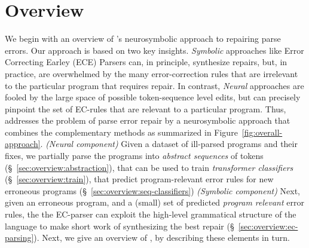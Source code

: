 \section{Overview}
\label{sec:overview}

We begin with an overview of \toolname's neurosymbolic
approach to repairing parse errors.
%
Our approach is based on two key insights.
%
\emph{Symbolic} approaches like Error Correcting
Earley (ECE) Parsers \citep{Aho_1972} can, in principle,
synthesize repairs, but, in practice, are overwhelmed by
the many error-correction rules that are irrelevant to the
particular program that requires repair.
%
In contrast, \emph{Neural} approaches
are fooled by the large space of possible
token-sequence level edits, but can precisely
pinpoint the set of EC-rules that are relevant
to a particular program.
%
Thus, \toolname addresses the problem of parse
error repair by a neurosymbolic approach that
combines the complementary methods as summarized
in Figure~\ref{fig:overall-approach}.
%
%
\emph{(Neural component)}
%
Given a dataset of ill-parsed programs and
their fixes, we partially parse the programs
into \emph{abstract sequences} of tokens
(\S~\ref{sec:overview:abstraction}), that can
be used to train \emph{transformer classifiers}
(\S~\ref{sec:overview:train}), that predict
program-relevant error rules for new erroneous
programs (\S~\ref{sec:overview:seq-classifiers})
%
\emph{(Symbolic component)}
%
Next, given an erroneous program, and a (small) set of
predicted \emph{program relevant} error rules, the
the EC-parser can exploit the high-level grammatical
structure of the language to make short work of
synthesizing the best repair (\S~\ref{sec:overview:ec-parsing}).
%
Next, we give an overview of \toolname, by describing these elements in turn.





